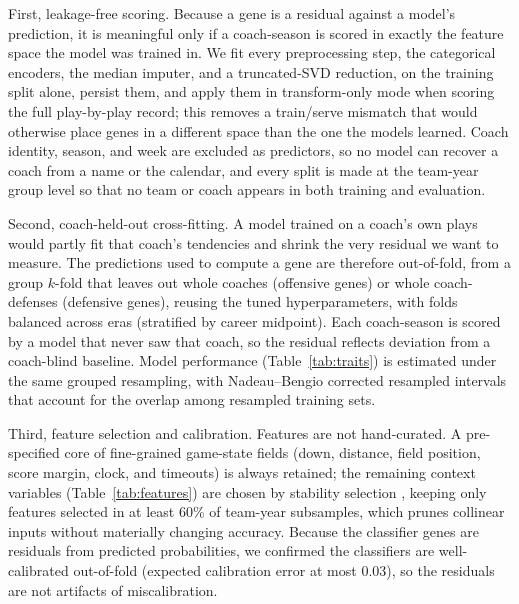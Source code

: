 \documentclass[11pt]{article}
\begin{document}
First, leakage-free scoring. Because a gene is a residual against a model's
prediction, it is meaningful only if a coach-season is scored in exactly the feature
space the model was trained in. We fit every preprocessing step, the categorical
encoders, the median imputer, and a truncated-SVD reduction, on the training split
alone, persist them, and apply them in transform-only mode when scoring the full
play-by-play record; this removes a train/serve mismatch that would otherwise place
genes in a different space than the one the models learned. Coach identity, season,
and week are excluded as predictors, so no model can recover a coach from a name or
the calendar, and every split is made at the team-year group level so that no team
or coach appears in both training and evaluation.

Second, coach-held-out cross-fitting. A model trained on a coach's own plays would
partly fit that coach's tendencies and shrink the very residual we want to measure.
The predictions used to compute a gene are therefore out-of-fold, from a group
$k$-fold that leaves out whole coaches (offensive genes) or whole coach-defenses
(defensive genes), reusing the tuned hyperparameters, with folds balanced across
eras (stratified by career midpoint). Each coach-season is scored by a model that
never saw that coach, so the residual reflects deviation from a coach-blind
baseline. Model performance (Table~\ref{tab:traits}) is estimated under the same
grouped resampling, with Nadeau--Bengio corrected resampled intervals
\citep{nadeau2003} that account for the overlap among resampled training sets.

Third, feature selection and calibration. Features are not hand-curated. A
pre-specified core of fine-grained game-state fields (down, distance, field
position, score margin, clock, and timeouts) is always retained; the remaining
context variables (Table~\ref{tab:features}) are chosen by stability selection
\citep{meinshausen2010}, keeping only features selected in at least 60\% of
team-year subsamples, which prunes collinear inputs without materially changing
accuracy. Because the classifier genes are residuals from predicted probabilities,
we confirmed the classifiers are well-calibrated out-of-fold (expected calibration
error at most 0.03), so the residuals are not artifacts of miscalibration.
\end{document}
